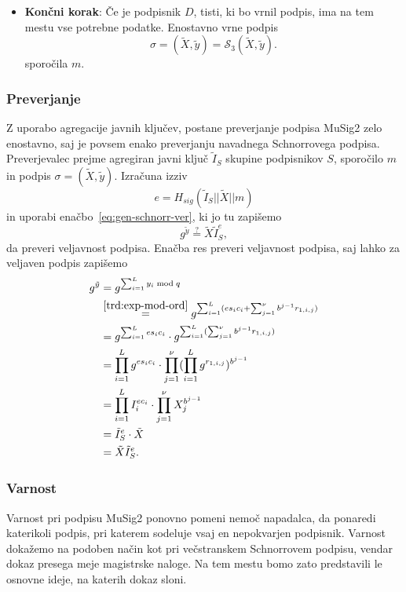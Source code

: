 \begin{itemize}
    \item \textbf{Končni korak}:
        Če je podpisnik $D$, tisti, ki bo vrnil podpis, ima na tem mestu vse potrebne podatke.
        Enostavno vrne podpis
        $$
        \sigma = (\tilde{X}, \tilde{y}) = \mathcal{S}_3(\tilde{X}, \tilde{y}).
        $$
        sporočila $m$.
\end{itemize}

\subsubsection{Preverjanje}
Z uporabo agregacije javnih ključev, postane preverjanje podpisa MuSig2 zelo enostavno, saj je
povsem enako preverjanju navadnega Schnorrovega podpisa. Preverjevalec prejme agregiran javni ključ
$\tilde{I}_S$ skupine podpisnikov $S$, sporočilo $m$ in podpis $\sigma = (\tilde{X}, \tilde{y})$.
Izračuna izziv
$$
e = H_{sig}(\tilde{I}_S || \tilde{X} || m)
$$ in uporabi enačbo~\eqref{eq:gen-schnorr-ver}, ki jo tu zapišemo
$$
g^{\tilde{y}} \stackrel{?}{=} \tilde{X} \tilde{I}_S^e,
$$
da preveri veljavnost podpisa. Enačba res preveri veljavnost podpisa, saj lahko za veljaven podpis
zapišemo
\begin{align*}
    g^{\tilde{y}} &= g^{\sum_{i=1}^L y_i \bmod q} \\
                  &\stackrel{\ref{trd:exp-mod-ord}}{=} g^{\sum_{i=1}^L (e s_i c_i + \sum_{j=1}^\nu b^{j-1} r_{1, i, j})} \\
    &= g^{\sum_{i=1}^L e s_i c_i} \cdot g^{\sum_{i=1}^L(\sum_{j=1}^\nu b^{j-1} r_{1, i, j})} \\
    &= \prod_{i=1}^L g^{e s_i c_i} \cdot \prod_{j=1}^\nu (\prod_{i=1}^L g^{r_{1, i, j}})^{b^{j-1}} \\
    &= \prod_{i=1}^L I_i^{e c_i} \cdot \prod_{j=1}^\nu X_j^{b^{j-1}} \\
    &= \tilde{I}_S^e \cdot \tilde{X} \\
    &= \tilde{X} \tilde{I}_S^e.
\end{align*}

\subsubsection{Varnost}
Varnost pri podpisu MuSig2 ponovno pomeni nemoč napadalca, da ponaredi katerikoli podpis, pri katerem
sodeluje vsaj en nepokvarjen podpisnik. Varnost dokažemo na podoben način kot pri večstranskem Schnorrovem
podpisu, vendar dokaz presega meje magistrske naloge. Na tem mestu bomo zato predstavili le osnovne
ideje, na katerih dokaz sloni.

